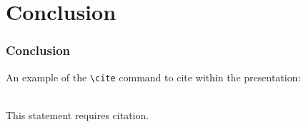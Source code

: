 
\section{Conclusion}
\begin{frame}[fragile] %
\frametitle{Conclusion}
An example of the \verb|\cite| command to cite within the presentation:\\~

This statement requires citation.
\end{frame}

